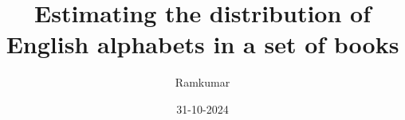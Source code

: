 \documentclass{beamer}
\title[Alphabets distribution in English books]{Estimating the distribution of English alphabets in a set of books}
\date{31-10-2024}
\author[Ramkumar]{Ramkumar}
\begin{document}
\frame{\maketitle}


\end{document}
